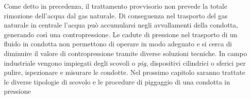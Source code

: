 Come detto in precedenza, il trattamento provvisorio non prevede la totale rimozione dell'acqua dal gas naturale. Di conseguenza nel trasporto del gas naturale in centrale l'acqua può accumularsi negli avvallamenti della condotta, generando così una contropressione. Le cadute di pressione nel trasporto di un fluido in condotta non permettono di operare in modo adeguato e si cerca di diminuire il valore di contropressione tramite diverse soluzioni tecniche. In campo industriale vengono impiegati degli scovoli o \textit{pig}, dispositivi cilindrici o sferici per pulire, ispezionare e misurare le condotte. Nel prossimo capitolo saranno trattate le diverse tipologie di scovolo e le procedure di piggaggio di una condotta in pressione